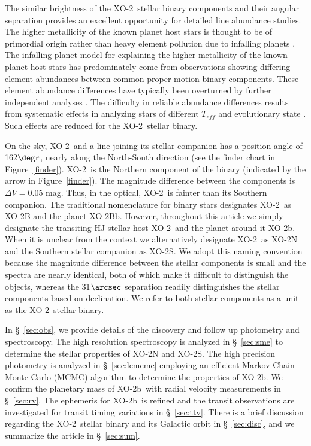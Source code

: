 \documentclass{emulateapj}
\newcommand{\xonb}{XO-2b}
\newcommand{\xon}{XO-2}
\newcommand{\vSepas}{31}
\begin{document}
The similar brightness of the \xon\ stellar binary components and
their angular separation provides an excellent opportunity for
detailed line abundance studies.  The higher metallicity of the known
planet host stars is thought to be of primordial origin rather than
heavy element pollution due to infalling planets \citep{FIS05,GON06}.
The infalling planet model for explaining the higher metallicity of
the known planet host stars has predominately come from observations
showing differing element abundances between common proper motion
binary components.  These element abundance differences have typically
been overturned by further independent analyses
\citep{GON06}.  The difficulty in reliable abundance differences
results from systematic effects in analyzing stars of different
$T_{eff}$ and evolutionary state \citep{SCH06}.  Such effects are
reduced for the \xon\ stellar binary.

On the sky, \xon\ and a line joining its stellar companion has a
position angle of 162$\degr$, nearly along the
North-South direction (see the finder chart in Figure~\ref{finder}).
\xon\ is the Northern component of the binary (indicated by the arrow
in Figure~\ref{finder}).  The magnitude difference between the
components is $\Delta V=0.05$ mag.  Thus, in the optical, \xon\ is
fainter than its Southern companion.  The traditional nomenclature for
binary stars designates \xon\ as \xon B and the planet
\xon Bb.  However, throughout this article we simply designate the
transiting HJ stellar host \xon\ and the planet around it
\xon b.  When it is unclear from the context we alternatively designate
\xon\ as \xon N and the Southern stellar companion as \xon S.  We adopt
this naming convention because the magnitude difference between the
stellar components is small and the spectra are nearly identical, both
of which make it difficult to distinguish the objects, whereas the
\vSepas $\arcsec$ separation readily distinguishes the stellar
components based on declination.  We refer to both stellar components
as a unit as the \xon\ stellar binary.

In \S~\ref{sec:obs}, we provide details of the discovery and follow up
photometry and spectroscopy.  The high resolution spectroscopy is
analyzed in \S~\ref{sec:sme} to determine the stellar properties of
\xon N and \xon S.  The high precision photometry is analyzed in
\S~\ref{sec:lcmcmc} employing an efficient Markov Chain Monte Carlo (MCMC) algorithm to
determine the properties of \xonb.  We confirm the planetary mass of
\xonb\ with radial velocity measurements in \S~\ref{sec:rv}.  The
ephemeris for \xonb\ is refined and the transit observations are
investigated for transit timing variations in \S~\ref{sec:ttv}.  There
is a brief discussion regarding the \xon\ stellar binary and its
Galactic orbit in \S~\ref{sec:disc}, and we summarize the article in
\S~\ref{sec:sum}.
\end{document}
